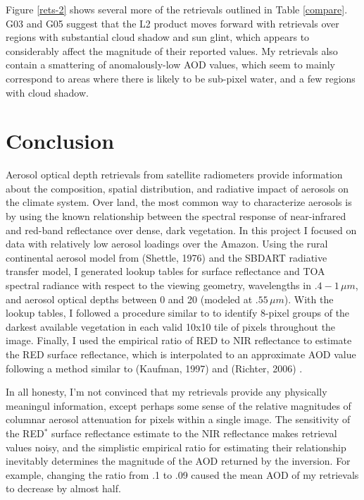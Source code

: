 \documentclass[12pt]{article}
\begin{document}
Figure \ref{rets-2} shows several more of the retrievals outlined in Table \ref{compare}. G03 and G05 suggest that the L2 product moves forward with retrievals over regions with substantial cloud shadow and sun glint, which appears to considerably affect the magnitude of their reported values. My retrievals also contain a smattering of anomalously-low AOD values, which seem to mainly correspond to areas where there is likely to be sub-pixel water, and a few regions with cloud shadow.

\section{Conclusion}

Aerosol optical depth retrievals from satellite radiometers provide information about the composition, spatial distribution, and radiative impact of aerosols on the climate system. Over land, the most common way to characterize aerosols is by using the known relationship between the spectral response of near-infrared and red-band reflectance over dense, dark vegetation. In this project I focused on data with relatively low aerosol loadings over the Amazon. Using the rural continental aerosol model from (Shettle, 1976) \cite{shettle_models_1976} and the SBDART radiative transfer model, I generated lookup tables for surface reflectance and TOA spectral radiance with respect to the viewing geometry, wavelengths in $.4-1\,\si{\mu m}$, and aerosol optical depths between 0 and 20 (modeled at $.55\,\si{\mu m}$). With the lookup tables, I followed a procedure similar to \cite{richter_automatic_2006} to identify 8-pixel groups of the darkest available vegetation in each valid 10x10 tile of pixels throughout the image. Finally, I used the empirical ratio of RED to NIR reflectance to estimate the RED surface reflectance, which is interpolated to an approximate AOD value following a method similar to (Kaufman, 1997) and (Richter, 2006) \cite{kaufman_operational_1997}\cite{richter_automatic_2006}.

In all honesty, I'm not convinced that my retrievals provide any physically meaningul information, except perhaps some sense of the relative magnitudes of columnar aerosol attenuation for pixels within a single image. The sensitivity of the RED$^*$ surface reflectance estimate to the NIR reflectance makes retrieval values noisy, and the simplistic empirical ratio for estimating their relationship inevitably determines the magnitude of the AOD returned by the inversion. For example, changing the ratio from .1 to .09 caused the mean AOD of my retrievals to decrease by almost half.


\end{document}
